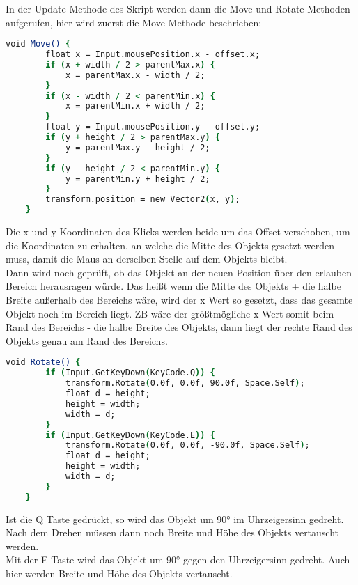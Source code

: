 {In der Update Methode des Skript werden dann die Move und Rotate Methoden aufgerufen, hier wird zuerst die Move Methode beschrieben:
\begin{lstlisting}[language=csh, caption={Methode zum Bewegen des Objekts im UIElementDraggers}]
void Move() {
        float x = Input.mousePosition.x - offset.x;
        if (x + width / 2 > parentMax.x) {
            x = parentMax.x - width / 2;
        }
        if (x - width / 2 < parentMin.x) {
            x = parentMin.x + width / 2;
        }
        float y = Input.mousePosition.y - offset.y;
        if (y + height / 2 > parentMax.y) {
            y = parentMax.y - height / 2;
        }
        if (y - height / 2 < parentMin.y) {
            y = parentMin.y + height / 2;
        }
        transform.position = new Vector2(x, y);
    }
\end{lstlisting}
Die x und y Koordinaten des Klicks werden beide um das Offset verschoben, um die Koordinaten zu erhalten, an welche die Mitte des Objekts gesetzt werden muss, damit die Maus an derselben Stelle auf dem Objekts bleibt.\\
Dann wird noch geprüft, ob das Objekt an der neuen Position über den erlauben Bereich herausragen würde. Das heißt wenn die Mitte des Objekts + die halbe Breite außerhalb des Bereichs wäre, wird der x Wert so gesetzt, dass das gesamte Objekt noch im Bereich liegt. ZB wäre der größtmögliche x Wert somit beim Rand des Bereichs - die halbe Breite des Objekts, dann liegt der rechte Rand des Objekts genau am Rand des Bereichs.\\

\begin{lstlisting}[language=csh, caption={Methode zum Drehen des Objekts im UIElementDraggers}]
void Rotate() {
        if (Input.GetKeyDown(KeyCode.Q)) {
            transform.Rotate(0.0f, 0.0f, 90.0f, Space.Self);
            float d = height;
            height = width;
            width = d;
        }
        if (Input.GetKeyDown(KeyCode.E)) {
            transform.Rotate(0.0f, 0.0f, -90.0f, Space.Self);
            float d = height;
            height = width;
            width = d;
        }
    }
\end{lstlisting}
Ist die Q Taste gedrückt, so wird das Objekt um 90° im Uhrzeigersinn gedreht. Nach dem Drehen müssen dann noch Breite und Höhe des Objekts vertauscht werden. \\
Mit der E Taste wird das Objekt um 90° gegen den Uhrzeigersinn gedreht. Auch hier werden Breite und Höhe des Objekts vertauscht.\\

}
